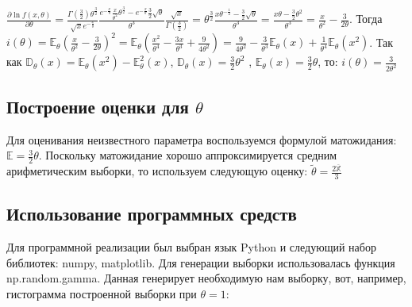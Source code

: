 \documentclass{article}
\begin{document}
$\frac{\partial\ln{f(x, \theta)}}{\partial \theta} = \frac{\Gamma(\frac{3}{2})\theta^{\frac{3}{2}}}{\sqrt{x}e^{-\frac{x}{\theta}}} \frac{e^{-\frac{x}{\theta}} \frac{x}{\theta^2} \theta^{\frac{3}{2}} - e^{-\frac{x}{\theta}}\frac{3}{2} \sqrt{\theta}}{\theta^3} \frac{\sqrt{x}}{\Gamma(\frac{3}{2})} = \theta^{\frac{3}{2}} \frac{x\theta^{-\frac{1}{2}} - \frac{3}{2} \sqrt{\theta}}{\theta^3} = \frac{x\theta - \frac{3}{2}\theta^2}{\theta^3} = \frac{x}{\theta^2} - \frac{3}{2\theta}$. \newline
Тогда $i(\theta) = \mathbb{E}_{\theta}(\frac{x}{\theta^2} - \frac{3}{2\theta})^2 = \mathbb{E}_{\theta} (\frac{x^2}{\theta^4} - \frac{3x}{\theta^3} + \frac{9}{4\theta^2}) = \frac{9}{4\theta^2} - \frac{3}{\theta^3} \mathbb{E}_{\theta}(x) + \frac{1}{\theta^4} \mathbb{E}_{\theta}(x^2)$. \newline \newline
Так как $\mathbb{D}_{\theta}(x) = \mathbb{E}_{\theta}(x^2) - \mathbb{E}^{2}_{\theta}(x)$,  $\mathbb{D}_{\theta}(x) = \frac{3}{2}\theta^2$ , $\mathbb{E}_{\theta}(x) = \frac{3}{2}\theta$, то:
\newline \newline
$i(\theta) = \frac{3}{2\theta^2}$

\subsection{Построение оценки для $\theta$}

Для оценивания неизвестного параметра воспользуемся формулой матожидания: $\mathbb{E} = \frac{3}{2} \theta$. Поскольку матожидание хорошо аппроксимируется средним арифметическим выборки, то используем следующую оценку: \newline
$\widetilde{\theta} = \frac{2\overline{\mathbb{X}}}{3}$

\subsection{Использование программных средств}

Для программной реализации был выбран язык Python и следующий набор библиотек: numpy, matplotlib. Для генерации выборки использовалась функция np.random.gamma. Данная генерирует необходимую нам выборку, вот, например, гистограмма построенной выборки при $\theta = 1$:
\end{document}
